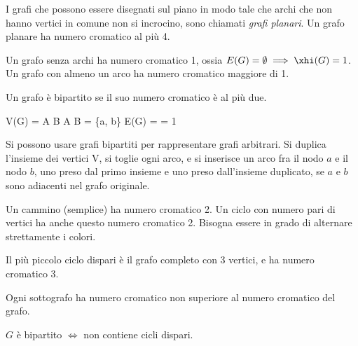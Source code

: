 	I grafi che possono essere disegnati sul piano in modo tale che archi che non hanno vertici in comune non si incrocino, sono chiamati \emph{grafi planari}.
	Un grafo planare ha numero cromatico al pi\`u 4.

	Un grafo senza archi ha numero cromatico 1, ossia $E(G) = \emptyset \implies \xhi(G) = 1$.
	Un grafo con almeno un arco ha numero cromatico maggiore di 1.

	\begin{defn}
		Un grafo \`e  bipartito se il suo numero cromatico \`e al pi\`u due.
	\end{defn}

	V(G) = A \cup B
	A \cap B = \emptyset
	\forall \{a, b\} \in E(G)  =  = 1

	Si possono usare grafi bipartiti per rappresentare grafi arbitrari.
	Si duplica l'insieme dei vertici V, si toglie ogni arco, e si inserisce un arco fra il nodo $a$ e il nodo $b$, uno preso dal primo insieme e uno preso dall'insieme duplicato, se $a$ e $b$ sono adiacenti nel grafo originale.

	Un cammino (semplice) ha numero cromatico 2.
	Un ciclo con numero pari di vertici ha anche questo numero cromatico 2.
	Bisogna essere in grado di alternare strettamente i colori.

	Il pi\`u piccolo ciclo dispari \`e il grafo completo con 3 vertici, e ha numero cromatico 3.

	Ogni sottografo ha numero cromatico non superiore al numero cromatico del grafo.

	\begin{prop}
		\label{prop_grafo_bipartito_cicli_dispari}
		$G$ \`e bipartito $\iff$ non contiene cicli dispari.
	\end{prop}

